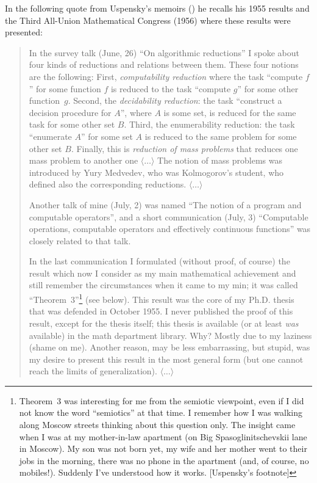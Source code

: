 \documentclass[12pt]{article}
\theoremstyle{remark}
\begin{document}
In the following quote from Uspensky's memoirs (\cite[p.~905--907, 912]{2018b}) he recalls his 1955 results and the Third All-Union Mathematical Congress (1956) where these results were presented:

\begin{quote}
In the survey talk (June, 26) ``On algorithmic reductions'' I spoke about four kinds of reductions and relations between them. These four notions are the following: First, \emph{computability reduction} where the task ``compute $f$'' for some function $f$ is reduced to the task ``compute $g$'' for some other function~$g$. Second, the \emph{decidability reduction}: the task ``construct a decision procedure for $A$'', where $A$ is some set, is reduced for the same task for some other set $B$. Third, the enumerability reduction: the task ``enumerate $A$'' for some set $A$ is reduced to the same problem for some other set $B$. Finally, this is \emph{reduction of mass problems} that reduces one mass problem to another one  $\langle\ldots\rangle$ The notion of mass problems was introduced by Yury Medvedev, who was Kolmogorov's student, who defined also the corresponding reductions. $\langle\ldots\rangle$

Another talk of mine (July, 2) was named ``The notion of a program and computable operators'', and a short communication (July, 3) ``Computable operations, computable operators and effectively continuous functions'' was closely related to that talk.

In the last communication I formulated (without proof, of course) the result which now I consider as my main mathematical achievement and still remember the circumstances when it came to my min; it was called ``Theorem~3''\footnote{Theorem~3 was interesting for me from the semiotic viewpoint, even if I did not know the word ``semiotics'' at that time. I remember how I was walking along Moscow streets thinking about this question only. The insight came when I was at my mother-in-law apartment (on Big Spasoglinitschevskii lane in Moscow). My son was not born yet, my wife and her mother went to their jobs in the morning, there was no phone in the apartment (and, of course, no mobiles!). Suddenly I've understood how it works. [Uspensky's footnote]} (see below). This result was the core of my Ph.D. thesis that was defended in October 1955.  I never published the proof of this result, except for the thesis itself; this thesis is available (or at least \emph{was} available) in the math department library. Why? Mostly due to my laziness (shame on me). Another reason, may be less embarrassing, but stupid, was my desire to present this result in the most general form (but one cannot reach the limits of generalization).
$\langle\ldots\rangle$


\end{quote}
\end{document}
